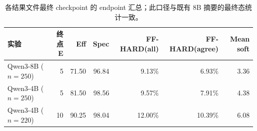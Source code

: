 \begin{table}[H]
\centering
\small
\caption{各结果文件最终 checkpoint 的 endpoint 汇总；此口径与既有 8B 摘要的最终态统计一致。}
\label{tab:endpoint}
\begin{tabular}{lrrrrrr}
\toprule
实验 & 终点 E & Eff & Spec & FF-HARD(all) & FF-HARD(agree) & Mean soft \\
\midrule
Qwen3-8B ($n=250$) & 5 & 71.50 & 96.84 & 9.13\% & 6.93\% & 3.36 \\
Qwen3-4B ($n=250$) & 5 & 81.50 & 98.56 & 9.57\% & 7.91\% & 4.38 \\
Qwen3-4B ($n=220$) & 10 & 90.25 & 98.04 & 12.00\% & 10.39\% & 6.08 \\
\bottomrule
\end{tabular}
\end{table}
